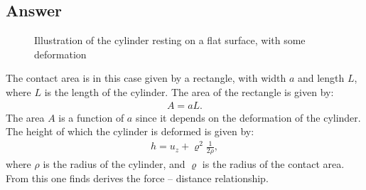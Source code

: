 \documentclass{article}
\begin{document}
\subsection*{Answer}
\begin{figure}[H]
    \centering
    \caption{Illustration of the cylinder resting on a flat surface, with some deformation}
    \label{fig: task5}
\end{figure}\noindent The contact area is in this case given by a rectangle, with width $a$ and length $L$, where $L$ is the length of the cylinder.
The area of the rectangle is given by:
\begin{align*}
    A = aL.
\end{align*}The area $A$ is a function of $a$ since it depends on the deformation of the cylinder. The height of which the cylinder is deformed is given by:
\begin{align*}
    h = u_z + \varrho^2\frac{1}{2\rho},
\end{align*}where $\rho$ is the radius of the cylinder, and $\varrho$ is the radius of the contact area. From this one finds derives the force -- distance relationship.
\end{document}
